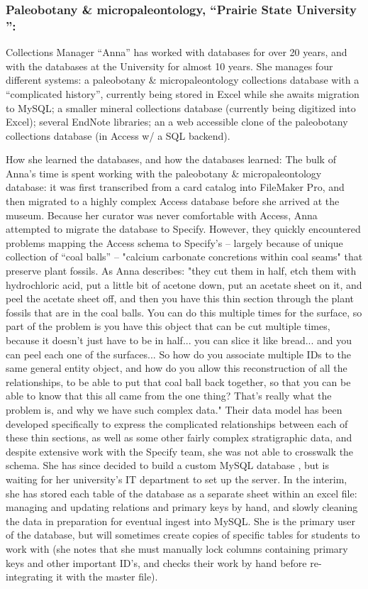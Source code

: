 \subsubsection{Paleobotany & micropaleontology, “Prairie State University ”:}
 Collections Manager “Anna” has worked with databases for over 20 years, and with the databases at the University for almost 10 years.  She manages four different systems: a paleobotany & micropaleontology collections database with a “complicated history”, currently being stored in Excel while she awaits migration to MySQL; a smaller mineral collections database (currently being digitized into Excel); several EndNote libraries; an a web accessible clone of the paleobotany collections database (in Access w/ a SQL backend).

How she learned the databases, and how the databases learned:  The bulk of Anna’s time is spent working with the paleobotany & micropaleontology database: it was first transcribed from a card catalog into FileMaker Pro, and then migrated to a highly complex Access database before she arrived at the museum.  Because her curator was never comfortable with Access, Anna attempted to migrate the database to Specify. However, they quickly encountered problems mapping the Access schema to Specify’s – largely because of unique collection of “coal balls” -- "calcium carbonate concretions within coal seams" that preserve plant fossils.  As Anna describes:
"they cut them in half, etch them with hydrochloric acid, put a little bit of acetone down, put an acetate sheet on it, and peel the acetate sheet off, and then you have this thin section through the plant fossils that are in the coal balls.  You can do this multiple times for the surface, so part of the problem is you have this object that can be cut multiple times, because it doesn't just have to be in half... you can slice it like bread... and you can peel each one of the surfaces...  So how do you associate multiple IDs to the same general entity object, and how do you allow this reconstruction of all the relationships, to be able to put that coal ball back together, so that you can be able to know that this all came from the one thing?  That's really what the problem is, and why we have such complex data."
Their data model has been developed specifically to express the complicated relationships between each of these thin sections, as well as some other fairly complex stratigraphic data, and despite extensive work with the Specify team, she was not able to crosswalk the schema.  She has since decided to build a custom MySQL database , but is waiting for her university’s IT department to set up the server.  In the interim, she has stored each table of the database as a separate sheet within an excel file: managing and updating relations and primary keys by hand, and slowly cleaning the data in preparation for eventual ingest into MySQL. She is the primary user of the database, but will sometimes create copies of specific tables for students to work with (she notes that she must manually lock columns containing primary keys and other important ID’s, and checks their work by hand before re-integrating it with the master file).

